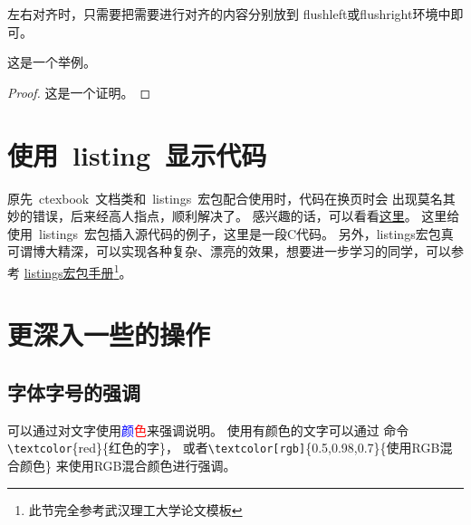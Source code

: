 左右对齐时，只需要把需要进行对齐的内容分别放到 flushleft或flushright环境中即可。
\begin{example}
这是一个举例。
\end{example}
\begin{proof}
这是一个证明。
\end{proof}

\section{使用~listing~显示代码}
原先~ctexbook~文档类和~listings~宏包配合使用时，代码在换页时会
出现莫名其妙的错误，后来经高人指点，顺利解决了。
感兴趣的话，可以看看\href{http://bbs.ctex.org/viewthread.php?tid=53451}{这里}。
这里给使用~listings~宏包插入源代码的例子，这里是一段C代码。
另外，listings宏包真可谓博大精深，可以实现各种复杂、漂亮的效果，想要进一步学习的同学，可以参考
\href{http://mirror.ctan.org/macros/latex/contrib/listings/listings.pdf}
{listings宏包手册\footnote{此节完全参考武汉理工大学论文模板}}。

\section{更深入一些的操作}

\subsection{字体字号的强调}
可以通过对文字使用\textcolor{blue}{颜}\textcolor{red}{色}来强调说明。
使用\textcolor[rgb]{0.5,0.95,0.96}{有颜色的文字}可以通过
命令\texttt{\textbackslash textcolor}\{red\}\{红色的字\}，
或者\texttt{\textbackslash textcolor[rgb]}\{0.5,0.98,0.7\}\{使用RGB混合颜色\}
来\textcolor[rgb]{0.5,0.98,0.7}{使用RGB混合颜色}进行强调。

